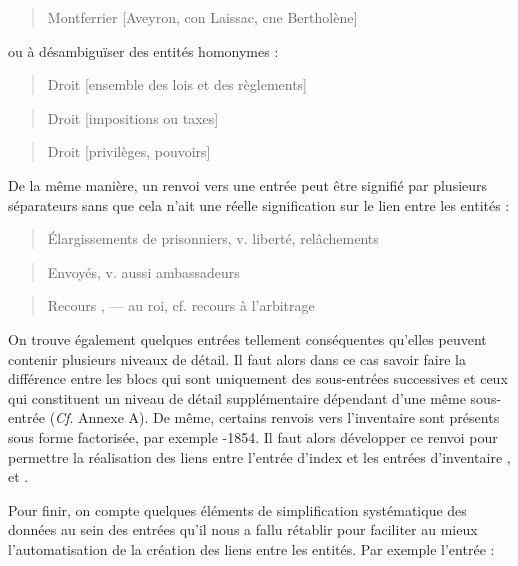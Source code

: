 \documentclass[a4paper,12pt,twoside]{book}
\begin{document}
	\begin{quotation}
		Montferrier [Aveyron, con Laissac, cne Bertholène]
	\end{quotation}

	\noindent ou à désambiguïser des entités homonymes :

	\begin{quotation}
		Droit [ensemble des lois et des règlements]
	\end{quotation}

	\begin{quotation}
		Droit [impositions ou taxes]
	\end{quotation}

	\begin{quotation}
		Droit [privilèges, pouvoirs]
	\end{quotation}
	
	De la même manière, un renvoi vers une entrée peut être signifié par plusieurs séparateurs sans que cela n'ait une réelle signification sur le lien entre les entités :
	
	\begin{quotation}
		Élargissements de prisonniers, v. liberté, relâchements
	\end{quotation}

	\begin{quotation}
		Envoyés, v. aussi ambassadeurs
	\end{quotation}

	\begin{quotation}
		Recours , — au roi, cf. recours à l'arbitrage
	\end{quotation}
	
	On trouve également quelques entrées tellement conséquentes qu'elles peuvent contenir plusieurs niveaux de détail. Il faut alors dans ce cas savoir faire la différence entre les blocs qui sont uniquement des sous-entrées successives et ceux qui constituent un niveau de détail supplémentaire dépendant d'une même sous-entrée (\textit{Cf}. Annexe A). De même, certains renvois vers l'inventaire sont présents sous forme factorisée, par exemple -1854\fg{}. Il faut alors développer ce renvoi pour permettre la réalisation des liens entre l'entrée d'index et les entrées d'inventaire \fg{}, \fg{} et \fg{}.
	
	Pour finir, on compte quelques éléments de simplification systématique des données au sein des entrées qu'il nous a fallu rétablir pour faciliter au mieux l'automatisation de la création des liens entre les entités. Par exemple l'entrée :
	
\end{document}
